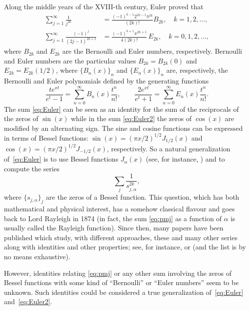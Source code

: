 \documentclass[10pt,a4paper]{article}
\theoremstyle{plain}
\theoremstyle{definition}
\numberwithin{equation}{section} %
\begin{document}
Along the middle years of the XVIII-th century, Euler proved that
\begin{align}
\label{eq:Euler}
  \sum_{j=1}^{\infty} \frac{1}{j^{2k}}
  &= \frac{(-1)^{k-1}2^{2k-1}\pi^{2k}}{(2k)!} B_{2k}, \quad k=1,2,\dots,
  \\
  \label{eq:Euler2}
  \sum_{j=1}^{\infty} \frac{(-1)^{j}}{(2j-1)^{2k+1}}
  &= \frac{(-1)^{k+1} \pi^{2k+1}}{4(2k)!}\,E_{2k}, \quad k=0,1,2,\dots,
\end{align}
where $B_{2k}$ and $E_{2k}$ are the Bernoulli and Euler numbers, respectively. Bernoulli and Euler numbers are the particular values $B_{2k} = B_{2k}(0)$ and $E_{2k}=E_{2k}(1/2)$, where $\{B_n(x)\}_n$ and $\{E_n(x)\}_n$ are, respectively, the Bernoulli and Euler polynomials defined by the generating functions
\[
  \frac{te^{xt}}{e^t-1} = \sum_{n=0}^\infty B_n(x)\frac{t^n}{n!},
  \qquad
  \frac{2e^{xt}}{e^t+1} = \sum_{n=0}^\infty E_n(x)\frac{t^n}{n!}.
\]
The sum \eqref{eq:Euler} can be seen as an identity for the sum of the reciprocals of the zeros of $\sin(x)$ while in the sum \eqref{eq:Euler2}
the zeros of $\cos(x)$ are modified by an alternating sign.
The sine and cosine functions can be expressed in terms of Bessel functions: $\sin(x) = (\pi x/2)^{1/2} J_{1/2}(x)$
and  $\cos(x) = (\pi x/2)^{1/2}J_{-1/2}(x)$, respectively. So a natural generalization of~\eqref{eq:Euler} is to use Bessel functions $J_\alpha(x)$ (see, for instance, \cite{Wat, Le, OlMa-NIST}) and to compute the series
\begin{equation}
\label{eq:pmj}
  \sum_{j} \frac{1}{s_{j,\alpha}^{2k}},
\end{equation}
where $\{s_{j,\alpha}\}_j$ are the zeros of a Bessel function. This question, which has both mathematical and physical interest, has a somehow classical flavour and goes back to Lord Rayleigh in 1874 \cite{Ray} (in fact, the sum \eqref{eq:pmj} as a function of $\alpha$ is usually called the Rayleigh function). Since then, many papers have been published which study, with different approaches, these and many other series
along with identities and other properties; see, for instance, \cite{Sne, Ki, Ke, BMPS,dL} or \cite[formula 11 in \S\,5.7.33]{PBM} (and the list is by no means exhaustive).

However, identities relating \eqref{eq:pmj} or any other sum involving the zeros of Bessel functions
with some kind of ``Bernoulli'' or ``Euler numbers'' seem to be unknown.
Such identities could be considered a true generalization of~\eqref{eq:Euler} and~\eqref{eq:Euler2}.
\end{document}
